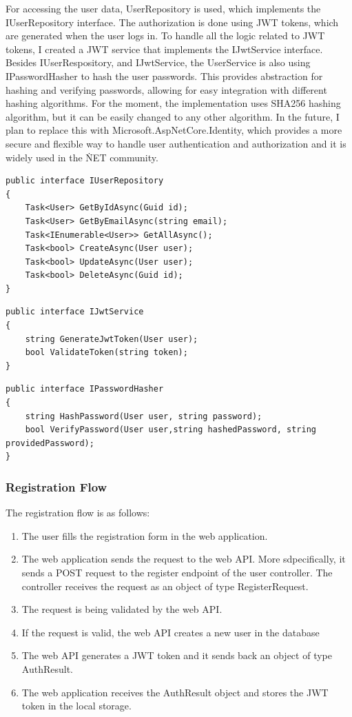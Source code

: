 For accessing the user data, UserRepository is used, which implements the IUserRepository interface.
The authorization is done using JWT tokens, 
which are generated when the user logs in. To handle all the logic related to 
JWT tokens, I created a JWT service that implements the IJwtService interface.
Besides IUserRespository, and IJwtService, the UserService is also using
IPasswordHasher to hash the user passwords. This provides abstraction
for hashing and verifying passwords, 
allowing for easy integration with different hashing algorithms. For the moment,
the implementation uses SHA256 hashing algorithm, 
but it can be easily changed to any other algorithm. In the future, I plan to replace
this with Microsoft.AspNetCore.Identity, 
which provides a more secure and flexible way to handle user 
authentication and authorization and it is widely used in the \.NET community.

\begin{lstlisting}[caption={User Repository interface}]
public interface IUserRepository
{
    Task<User> GetByIdAsync(Guid id);
    Task<User> GetByEmailAsync(string email);
    Task<IEnumerable<User>> GetAllAsync();
    Task<bool> CreateAsync(User user);
    Task<bool> UpdateAsync(User user);
    Task<bool> DeleteAsync(Guid id);
}
\end{lstlisting}

\begin{lstlisting}[caption={JWT Service interface}]
public interface IJwtService
{
    string GenerateJwtToken(User user);
    bool ValidateToken(string token);
}
\end{lstlisting}

\begin{lstlisting}[caption={Password Hasher interface}]
public interface IPasswordHasher
{
    string HashPassword(User user, string password);
    bool VerifyPassword(User user,string hashedPassword, string providedPassword);
}
\end{lstlisting}

\subsubsection{Registration Flow}
The registration flow is as follows:
\begin{enumerate}
    \item The user fills the registration form in the web application.
    \item The web application sends the request to the web API. More sdpecifically, 
    it sends a POST request to the register endpoint of the user controller. The controller
    receives the request as an object of type RegisterRequest.
    \item The request is being validated by the web API.
    \item If the request is valid, the web API creates a new user in the database
    \item The web API generates a JWT token and it sends back an object of type AuthResult.
    \item The web application receives the AuthResult object and stores the JWT token in the local storage.
\end{enumerate}

